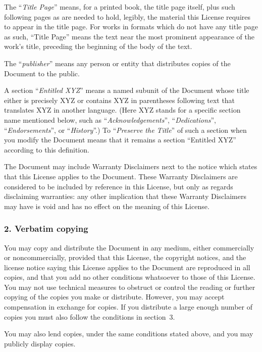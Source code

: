 \documentclass[a4paper,openany]{book}
\begin{document}
\begin{results}
The ``\emph{Title Page}'' means, for a printed book, the title page itself,
plus such following pages as are needed to hold, legibly, the material
this License requires to appear in the title page.  For works in
formats which do not have any title page as such, ``Title Page'' means
the text near the most prominent appearance of the work's title,
preceding the beginning of the body of the text.

The ``\emph{publisher}'' means any person or entity that distributes
copies of the Document to the public.

A section ``\emph{Entitled XYZ}'' means a named subunit of the Document whose
title either is precisely XYZ or contains XYZ in parentheses following
text that translates XYZ in another language.  (Here XYZ stands for a
specific section name mentioned below, such as ``\emph{Acknowledgements}'',
``\emph{Dedications}'', ``\emph{Endorsements}'', or ``\emph{History}''.)
To ``\emph{Preserve the Title}''
of such a section when you modify the Document means that it remains a
section ``Entitled XYZ'' according to this definition.

The Document may include Warranty Disclaimers next to the notice which
states that this License applies to the Document.  These Warranty
Disclaimers are considered to be included by reference in this
License, but only as regards disclaiming warranties: any other
implication that these Warranty Disclaimers may have is void and has
no effect on the meaning of this License.

\subsubsection*{2. Verbatim copying}

You may copy and distribute the Document in any medium, either
commercially or noncommercially, provided that this License, the
copyright notices, and the license notice saying this License applies
to the Document are reproduced in all copies, and that you add no other
conditions whatsoever to those of this License.  You may not use
technical measures to obstruct or control the reading or further
copying of the copies you make or distribute.  However, you may accept
compensation in exchange for copies.  If you distribute a large enough
number of copies you must also follow the conditions in section~3.

You may also lend copies, under the same conditions stated above, and
you may publicly display copies.


\end{results}
\end{document}
